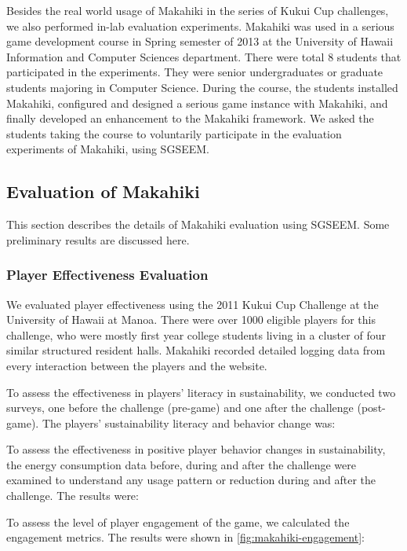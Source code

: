 \documentclass{sigchi}
\begin{document}
Besides the real world usage of Makahiki in the series of Kukui Cup challenges, we also
performed in-lab evaluation experiments. Makahiki was used in a serious game development
course in Spring semester of 2013 at the University of Hawaii Information and Computer Sciences department. There
were total 8 students that participated in the experiments. They were senior undergraduates
 or graduate students majoring in Computer Science. During the course, the students
installed Makahiki, configured and designed a serious game instance with Makahiki, and
finally developed an enhancement to the Makahiki framework. We asked the students taking
the course to voluntarily participate in the evaluation experiments of Makahiki, using
SGSEEM.

\subsection{Evaluation of Makahiki}

This section describes the details of Makahiki evaluation using SGSEEM. Some preliminary results are discussed here.

\subsubsection{Player Effectiveness Evaluation}

We evaluated player effectiveness using the 2011 Kukui Cup Challenge at
the University of Hawaii at Manoa. There were over 1000 eligible players
for this challenge, who were mostly first year college students living
in a cluster of four similar structured resident halls. Makahiki
recorded detailed logging data from every interaction between the
players and the website.

To assess the effectiveness in players' literacy in sustainability, we conducted
two surveys, one before the challenge (pre-game) and one after the challenge (post-game).
The players' sustainability literacy and behavior change was:

To assess the effectiveness in positive player behavior changes in sustainability, the
energy consumption data before, during and after the challenge were
examined to understand any usage pattern or reduction during and after
the challenge. The results were:

To assess the level of player engagement of the game, we calculated the engagement
metrics. The results were shown in \autoref{fig:makahiki-engagement}:
\end{document}
